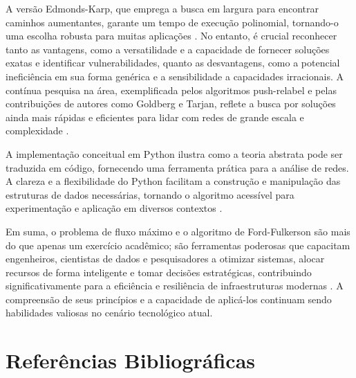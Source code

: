 \documentclass[12pt]{article}
\begin{document}
\noindent A versão Edmonds-Karp, que emprega a busca em largura para encontrar caminhos aumentantes, garante um tempo de execução polinomial, tornando-o uma escolha robusta para muitas aplicações \cite{edmonds1972theoretical}. No entanto, é crucial reconhecer tanto as vantagens, como a versatilidade e a capacidade de fornecer soluções exatas e identificar vulnerabilidades, quanto as desvantagens, como a potencial ineficiência em sua forma genérica e a sensibilidade a capacidades irracionais. A contínua pesquisa na área, exemplificada pelos algoritmos push-relabel e pelas contribuições de autores como Goldberg e Tarjan, reflete a busca por soluções ainda mais rápidas e eficientes para lidar com redes de grande escala e complexidade \cite{goldberg1988,goldberg1998faster}.

\noindent A implementação conceitual em Python ilustra como a teoria abstrata pode ser traduzida em código, fornecendo uma ferramenta prática para a análise de redes. A clareza e a flexibilidade do Python facilitam a construção e manipulação das estruturas de dados necessárias, tornando o algoritmo acessível para experimentação e aplicação em diversos contextos \cite{rossum2009python}.

\noindent Em suma, o problema de fluxo máximo e o algoritmo de Ford-Fulkerson são mais do que apenas um exercício acadêmico; são ferramentas poderosas que capacitam engenheiros, cientistas de dados e pesquisadores a otimizar sistemas, alocar recursos de forma inteligente e tomar decisões estratégicas, contribuindo significativamente para a eficiência e resiliência de infraestruturas modernas \cite{kleinberg2006}. A compreensão de seus princípios e a capacidade de aplicá-los continuam sendo habilidades valiosas no cenário tecnológico atual.

\newpage
\section{Referências Bibliográficas}



\end{document}
